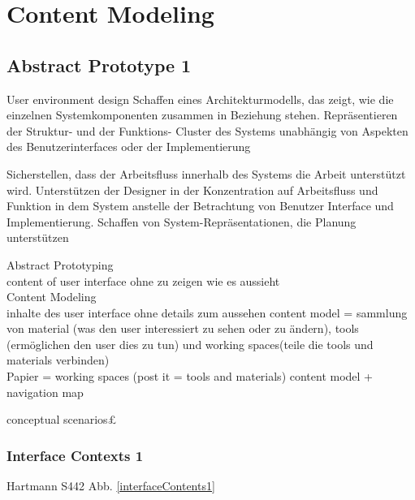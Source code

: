 
\section{Content Modeling}

\subsection{Abstract Prototype 1}

User environment design Schaffen eines Architekturmodells, das zeigt, wie die einzelnen Systemkomponenten zusammen in Beziehung stehen. Repräsentieren der Struktur- und der Funktions- Cluster des Systems unabhängig von Aspekten des Benutzerinterfaces 
oder der Implementierung

Sicherstellen, dass der Arbeitsfluss innerhalb des Systems die Arbeit unterstützt wird. Unterstützen der Designer in der Konzentration auf Arbeitsfluss und Funktion in dem System anstelle der Betrachtung von Benutzer Interface und Implementierung. Schaffen von System-Repräsentationen, die Planung unterstützen

 Abstract Prototyping\\
 content of user interface ohne zu zeigen wie es aussieht\\

 Content Modeling \\
 inhalte des user interface ohne details zum aussehen
 content model = sammlung von material (was den user interessiert zu sehen oder zu ändern), tools (ermöglichen den user dies zu tun) und working spaces(teile die tools und materials verbinden)\\

 Papier = working spaces (post it = tools and materials)
 content model + navigation map

 conceptual scenarios£

\subsubsection{Interface Contexts 1}

Hartmann S442
Abb. \ref{interfaceContents1}


